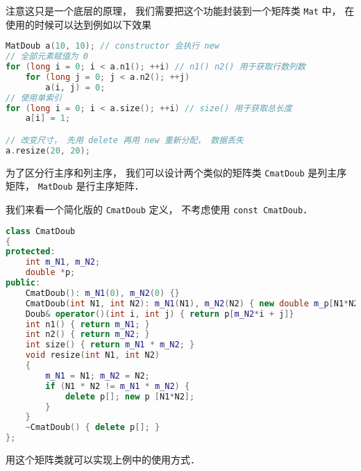 注意这只是一个底层的原理， 我们需要把这个功能封装到一个矩阵类 \verb|Mat| 中， 在使用的时候可以达到例如以下效果
\begin{lstlisting}[language=cpp]
MatDoub a(10, 10); // constructor 会执行 new
// 全部元素赋值为 0
for (long i = 0; i < a.n1(); ++i) // n1() n2() 用于获取行数列数
    for (long j = 0; j < a.n2(); ++j)
        a(i, j) = 0;
// 使用单索引
for (long i = 0; i < a.size(); ++i) // size() 用于获取总长度
    a[i] = 1;

// 改变尺寸， 先用 delete 再用 new 重新分配， 数据丢失
a.resize(20, 20);
\end{lstlisting}
为了区分行主序和列主序， 我们可以设计两个类似的矩阵类 \verb|CmatDoub| 是列主序矩阵， \verb|MatDoub| 是行主序矩阵．

我们来看一个简化版的 \verb|CmatDoub| 定义， 不考虑使用 \verb|const CmatDoub|．
\begin{lstlisting}[language=cpp]
class CmatDoub
{
protected:
    int m_N1, m_N2;
    double *p;
public:
    CmatDoub(): m_N1(0), m_N2(0) {}
    CmatDoub(int N1, int N2): m_N1(N1), m_N2(N2) { new double m_p[N1*N2]; }
    Doub& operator()(int i, int j) { return p[m_N2*i + j]}
    int n1() { return m_N1; }
    int n2() { return m_N2; }
    int size() { return m_N1 * m_N2; }
    void resize(int N1, int N2)
    {
        m_N1 = N1; m_N2 = N2;
        if (N1 * N2 != m_N1 * m_N2) {
            delete p[]; new p [N1*N2];
        }
    }
    ~CmatDoub() { delete p[]; }
};
\end{lstlisting}
用这个矩阵类就可以实现上例中的使用方式．

